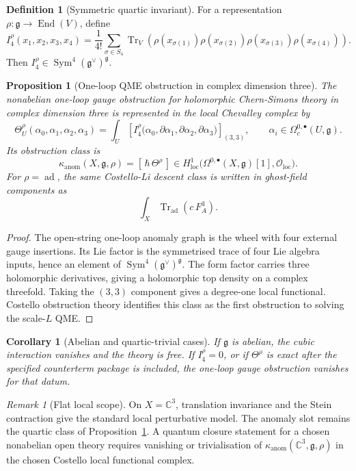 \documentclass[11pt]{article}
\newtheorem{proposition}[theorem]{Proposition}
\newtheorem{corollary}[theorem]{Corollary}
\theoremstyle{definition}
\newtheorem{definition}[theorem]{Definition}
\theoremstyle{remark}
\newtheorem{remark}[theorem]{Remark}
\providecommand{\C}{\mathbb{C}}
\providecommand{\fg}{\mathfrak{g}}
\providecommand{\ad}{\operatorname{ad}}
\providecommand{\Tr}{\operatorname{Tr}}
\providecommand{\Sym}{\operatorname{Sym}}
\providecommand{\End}{\operatorname{End}}
\providecommand{\cO}{\mathcal{O}}
\providecommand{\kanom}{\kappa_{\operatorname{anom}}}
\begin{document}
\begin{definition}[Symmetric quartic invariant]
\label{def:quartic-invariant}
For a representation $\rho:\fg\to\End(V)$, define
\[
  I_4^\rho(x_1,x_2,x_3,x_4)
  =
  \frac1{4!}\sum_{\sigma\in S_4}
  \Tr_V\!\left(
    \rho(x_{\sigma(1)})\rho(x_{\sigma(2)})
    \rho(x_{\sigma(3)})\rho(x_{\sigma(4)})
  \right).
\]
Then $I_4^\rho\in\Sym^4(\fg^\vee)^\fg$.
\end{definition}

\begin{proposition}[One-loop QME obstruction in complex dimension three]
\label{prop:qme-obstruction}
The nonabelian one-loop gauge obstruction for holomorphic
Chern-Simons theory in complex dimension three is represented in the
local Chevalley complex by
\[
  \Theta^\rho_U(\alpha_0,\alpha_1,\alpha_2,\alpha_3)
  =
  \int_U
  \left[
  I_4^\rho\bigl(
    \alpha_0,\partial\alpha_1,\partial\alpha_2,\partial\alpha_3
  \bigr)
  \right]_{(3,3)},
  \qquad
  \alpha_i\in\Omega^{0,\bullet}_c(U,\fg).
\]
Its obstruction class is
\[
  \kanom(X,\fg,\rho)
  =
  [\,\hbar\,\Theta^\rho\,]
  \in
  H^1_{\mathrm{loc}}
  \bigl(\Omega^{0,\bullet}(X,\fg)[1],\cO_{\mathrm{loc}}\bigr).
\]
For $\rho=\ad$, the same Costello-Li descent class is written in
ghost-field components as
\[
  \int_X \Tr_{\ad}(c\,F_A^3).
\]
\end{proposition}

\begin{proof}
The open-string one-loop anomaly graph is the wheel with four external
gauge insertions.  Its Lie factor is the symmetrised trace of four Lie
algebra inputs, hence an element of $\Sym^4(\fg^\vee)^\fg$.  The form
factor carries three holomorphic derivatives, giving a holomorphic top
density on a complex threefold.  Taking the $(3,3)$ component gives a
degree-one local functional.  Costello obstruction theory identifies
this class as the first obstruction to solving the scale-$L$ QME.
\end{proof}

\begin{corollary}[Abelian and quartic-trivial cases]
\label{cor:abelian-quartic-trivial}
If $\fg$ is abelian, the cubic interaction vanishes and the theory is
free.  If $I_4^\rho=0$, or if $\Theta^\rho$ is exact after the specified
counterterm package is included, the one-loop gauge obstruction
vanishes for that datum.
\end{corollary}

\begin{remark}[Flat local scope]
\label{rem:flat-scope}
On $X=\C^3$, translation invariance and the Stein contraction give the
standard local perturbative model.  The anomaly slot remains the
quartic class of Proposition~\ref{prop:qme-obstruction}.  A quantum
closure statement for a chosen nonabelian open theory requires
vanishing or trivialisation of
$\kanom(\C^3,\fg,\rho)$ in the chosen Costello local functional complex.
\end{remark}
\end{document}
